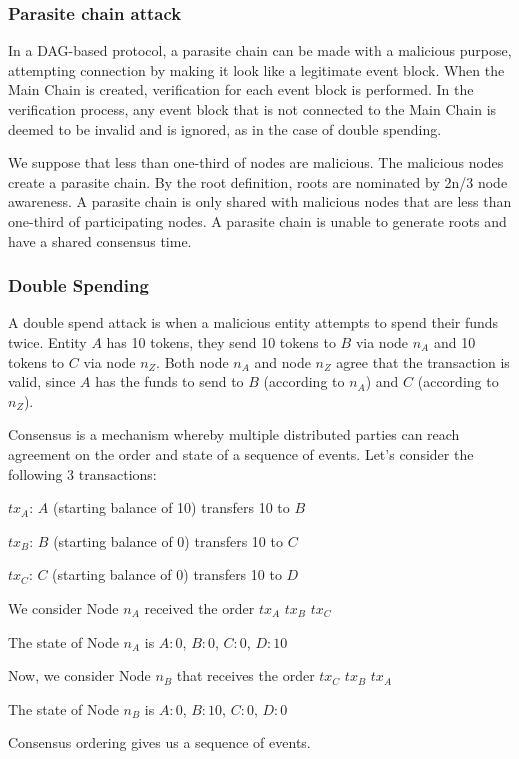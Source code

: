 \documentclass[preprint,12pt]{elsarticle}
\begin{document}
\subsubsection{Parasite chain attack}
In a DAG-based protocol, a parasite chain can be made with a malicious purpose, attempting connection by making it look like a legitimate event block. When the Main Chain is created, verification for each event block is performed. In the verification process, any event block that is not connected to the Main Chain is deemed to be invalid and is ignored, as in the case of double spending.

We suppose that less than one-third of nodes are malicious. The malicious nodes create a parasite chain. By the root definition, roots are nominated by 2n/3 node awareness. A parasite chain is only shared with malicious nodes that are less than one-third of participating nodes. A parasite chain is unable to generate roots and have a shared consensus time.

\subsubsection{Double Spending}
A double spend attack is when a malicious entity attempts to spend their funds twice. Entity $A$ has 10 tokens, they send 10 tokens to $B$ via node $n_A$ and 10 tokens to $C$ via node $n_Z$. Both node $n_A$ and node $n_Z$ agree that the transaction is valid, since $A$ has the funds to send to $B$ (according to $n_A$) and $C$ (according to $n_Z$).

Consensus is a mechanism whereby multiple distributed parties can reach agreement on the order and state of a sequence of events. Let’s consider the following 3 transactions:

$tx_A$: $A$ (starting balance of 10) transfers 10 to $B$

$tx_B$: $B$ (starting balance of 0) transfers 10 to $C$

$tx_C$: $C$ (starting balance of 0) transfers 10 to $D$

We consider Node $n_A$ received the order $tx_A$ $tx_B$ $tx_C$

The state of Node $n_A$ is $A:0$, $B:0$, $C:0$, $D:10$

Now, we consider Node $n_B$ that receives the order $tx_C$ $tx_B$ $tx_A$

The state of Node $n_B$ is $A:0$, $B:10$, $C:0$, $D:0$

Consensus ordering gives us a sequence of events.
\end{document}
